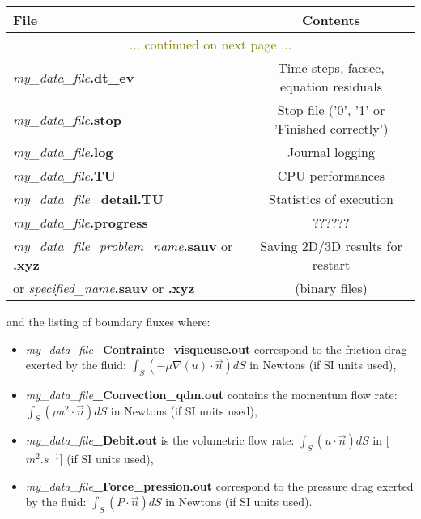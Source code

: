 \begin{longtable}{|l|c|}
\hline \textbf{File}                                    & \textbf{Contents} \\ \hline \hline \endhead
\hline\multicolumn{2}{|c|}{\textcolor{olive}{... continued on next page ...}}  \\ \hline \endfoot
\hline \endlastfoot
\textit{my\_data\_file}\textbf{.dt\_ev}                        & Time steps, facsec, equation residuals \\ \hline
\textit{my\_data\_file}\textbf{.stop}                          & Stop file ('0', '1' or 'Finished correctly') \\ \hline
\textit{my\_data\_file}\textbf{.log}                           & Journal logging  \\ \hline
\textit{my\_data\_file}\textbf{.TU}                            & CPU performances \\ \hline
\textit{my\_data\_file}\textbf{\_detail.TU}                    & Statistics of execution \\ \hline
\textit{my\_data\_file}\textbf{.progress}                      & ?????? \\ \hline
\textit{my\_data\_file\_problem\_name}\textbf{.sauv} or \textbf{.xyz}      & Saving 2D/3D results for restart \\
or \textit{specified\_name}\textbf{.sauv} or \textbf{.xyz}                 & (binary files) \\ \hline
\end{longtable}

and the listing of boundary fluxes where:
\begin{itemize}
\item \textit{my\_data\_file}\textbf{\_Contrainte\_visqueuse.out} correspond to the friction drag exerted by the fluid: $\int_S (-\mu \nabla(u) \cdot \vec{n}) dS$ in Newtons (if SI units used),
\item \textit{my\_data\_file}\textbf{\_Convection\_qdm.out} contains the momentum flow rate: \\
$\int_S (\rho u^2 \cdot \vec{n}) dS$ in Newtons (if SI units used),
\item \textit{my\_data\_file}\textbf{\_Debit.out} is the volumetric flow rate: $\int_S (u \cdot \vec{n}) dS$ in [$m^2.s^{-1}$] (if SI units used),
\item \textit{my\_data\_file}\textbf{\_Force\_pression.out} correspond to the pressure drag exerted by the fluid: $\int_S (P \cdot \vec{n}) dS$ in Newtons (if SI units used).
\end{itemize}

